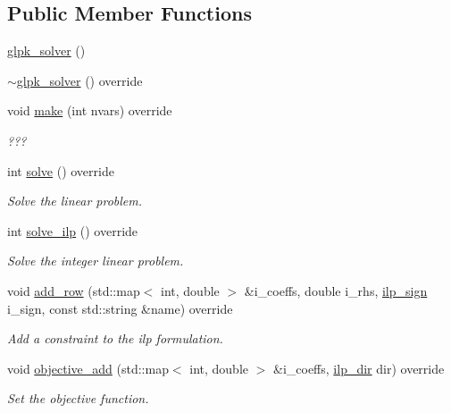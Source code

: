 \subsection*{Public Member Functions}
\begin{DoxyCompactItemize}
\item 
\hyperlink{classglpk__solver_aed422ea95479d03b421863fea89972f9}{glpk\+\_\+solver} ()
\item 
\hyperlink{classglpk__solver_a6fdba13c6b3d436d4b5c66a3246042bc}{$\sim$glpk\+\_\+solver} () override
\item 
void \hyperlink{classglpk__solver_a1b0f80ab919e5b0b702f050e52835c9a}{make} (int nvars) override
\begin{DoxyCompactList}\small\item\em ??? \end{DoxyCompactList}\item 
int \hyperlink{classglpk__solver_ab9787b0a1b68144bfd68fbf95a61ad51}{solve} () override
\begin{DoxyCompactList}\small\item\em Solve the linear problem. \end{DoxyCompactList}\item 
int \hyperlink{classglpk__solver_ad27b82487380811e19a1adc2628f8b07}{solve\+\_\+ilp} () override
\begin{DoxyCompactList}\small\item\em Solve the integer linear problem. \end{DoxyCompactList}\item 
void \hyperlink{classglpk__solver_aca58bff8b056f40912822a8063db14d6}{add\+\_\+row} (std\+::map$<$ int, double $>$ \&i\+\_\+coeffs, double i\+\_\+rhs, \hyperlink{classmeilp__solver_a2cb689f3c242a34eb05cff99704a3e8e}{ilp\+\_\+sign} i\+\_\+sign, const std\+::string \&name) override
\begin{DoxyCompactList}\small\item\em Add a constraint to the ilp formulation. \end{DoxyCompactList}\item 
void \hyperlink{classglpk__solver_ac1a448337e6c26eae851c455091d699a}{objective\+\_\+add} (std\+::map$<$ int, double $>$ \&i\+\_\+coeffs, \hyperlink{classmeilp__solver_a2f719db6577d73007d942af7e6fe907c}{ilp\+\_\+dir} dir) override
\begin{DoxyCompactList}\small\item\em Set the objective function. \end{DoxyCompactList}\item 

\end{DoxyCompactItemize}
